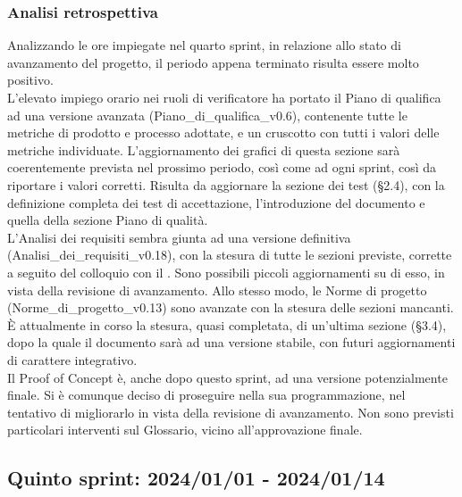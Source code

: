 \newpage
\subsubsection{Analisi retrospettiva}
Analizzando le ore impiegate nel quarto sprint, in relazione allo stato di avanzamento del progetto, il periodo appena terminato risulta essere molto positivo.\\
L'elevato impiego orario nei ruoli di verificatore ha portato il Piano di qualifica ad una versione avanzata (Piano\_di\_qualifica\_v0.6), contenente tutte le metriche di prodotto e processo adottate, e un cruscotto con tutti i valori delle metriche individuate. L'aggiornamento dei grafici di questa sezione sarà coerentemente prevista nel prossimo periodo, così come ad ogni sprint, così da riportare i valori corretti. Risulta da aggiornare la sezione dei test (§2.4), con la definizione completa dei test di accettazione, l'introduzione del documento e quella della sezione Piano di qualità.\\
L'Analisi dei requisiti sembra giunta ad una versione definitiva (Analisi\_dei\_requisiti\_v0.18), con la stesura di tutte le sezioni previste, corrette a seguito del colloquio con il . Sono possibili piccoli aggiornamenti su di esso, in vista della revisione di avanzamento. Allo stesso modo, le Norme di progetto (Norme\_di\_progetto\_v0.13) sono avanzate con la stesura delle sezioni mancanti. È attualmente in corso la stesura, quasi completata, di un'ultima sezione (§3.4), dopo la quale il documento sarà ad una versione stabile, con futuri aggiornamenti di carattere integrativo.\\
Il Proof of Concept è, anche dopo questo sprint, ad una versione potenzialmente finale. Si è comunque deciso di proseguire nella sua programmazione, nel tentativo di migliorarlo in vista della revisione di avanzamento.
Non sono previsti particolari interventi sul Glossario, vicino all'approvazione finale.
\newpage


\subsection{Quinto sprint: 2024/01/01 - 2024/01/14}


